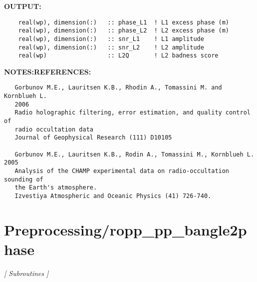 \textbf{OUTPUT:}\hspace{0.08in}\begin{Verbatim}
    real(wp), dimension(:)   :: phase_L1  ! L1 excess phase (m)
    real(wp), dimension(:)   :: phase_L2  ! L2 excess phase (m)
    real(wp), dimension(:)   :: snr_L1    ! L1 amplitude
    real(wp), dimension(:)   :: snr_L2    ! L2 amplitude
    real(wp)                 :: L2Q       ! L2 badness score
\end{Verbatim}
\textbf{NOTES:}\hspace{0.08in}\textbf{REFERENCES:}\hspace{0.08in}\begin{Verbatim}
   Gorbunov M.E., Lauritsen K.B., Rhodin A., Tomassini M. and Kornblueh L. 
   2006
   Radio holographic filtering, error estimation, and quality control of 
   radio occultation data
   Journal of Geophysical Research (111) D10105

   Gorbunov M.E., Lauritsen K.B., Rodin A., Tomassini M., Kornblueh L. 2005 
   Analysis of the CHAMP experimental data on radio-occultation sounding of
   the Earth's atmosphere.
   Izvestiya Atmospheric and Oceanic Physics (41) 726-740.
\end{Verbatim}
\section{Preprocessing/ropp\_pp\_bangle2phase}
\textsl{[ Subroutines ]}

